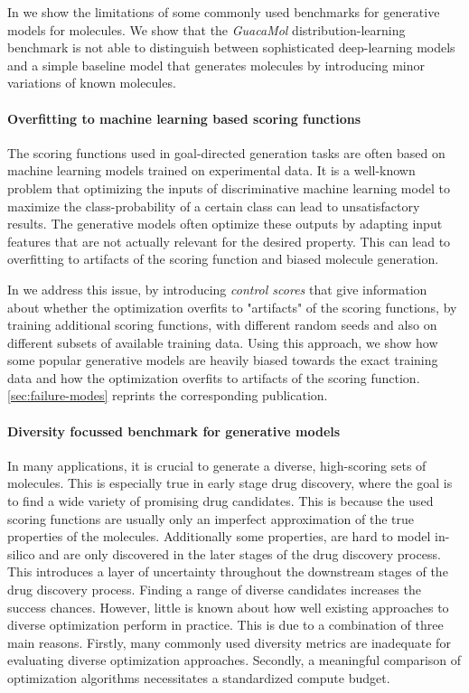 In \citep{renzFailureModesMolecule2019} we show the limitations of some commonly
used benchmarks for generative models for molecules. We show that the
\emph{GuacaMol} distribution-learning benchmark
\citep{brownGuacaMolBenchmarkingModels2019} is not able to distinguish between
sophisticated deep-learning models and a simple baseline model that generates
molecules by introducing minor variations of known molecules. 

\paragraph{Overfitting to machine learning based scoring functions} 
The scoring functions used in goal-directed generation tasks are often based on
machine learning models trained on experimental data. It is a well-known problem
that optimizing the inputs of discriminative machine learning model 
to maximize the class-probability of a certain class can lead to unsatisfactory results.
The generative models often optimize these outputs by adapting input features that 
are not actually relevant for the desired property. This can lead to overfitting to
artifacts of the scoring function and biased molecule generation.

In \citep{renzFailureModesMolecule2019} we address this issue, by introducing \emph{control scores} that give information
about whether the optimization overfits to "artifacts" of the scoring functions, 
by training additional scoring functions, with different random seeds and also on 
different subsets of available training data. Using this approach, 
we show how some popular generative models are heavily biased towards the exact training data
and how the optimization overfits to artifacts of the scoring function. \autoref{sec:failure-modes} 
reprints the corresponding publication.

\paragraph{Diversity focussed benchmark for generative models}
In many applications, it is crucial to generate a diverse, high-scoring sets of molecules. 
This is especially true in early stage drug discovery, where the goal is to find a wide variety of
promising drug candidates. This is because the used scoring functions are usually only an imperfect
approximation of the true properties of the molecules. Additionally some properties, are hard to model 
in-silico and are only discovered in the later stages of the drug discovery process.
This introduces a layer of uncertainty throughout the downstream stages of the drug discovery process. 
Finding a range of diverse candidates increases the success chances. However, little is known 
about how well existing approaches to diverse optimization perform in practice.
This is due to a combination of three main reasons. Firstly, many commonly used diversity metrics 
are inadequate for evaluating diverse optimization approaches. Secondly, a meaningful comparison of
optimization algorithms necessitates a standardized compute budget. 

